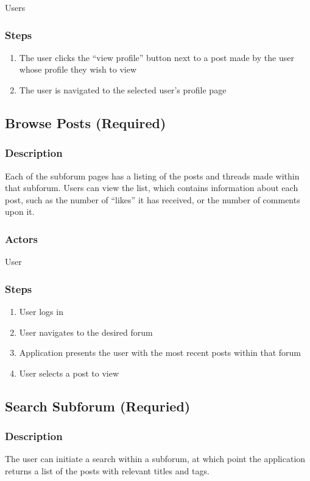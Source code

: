 \documentclass[12pt]{scrartcl}
\begin{document}
Users

\subsubsection{Steps}

\begin{enumerate}
\item The user clicks the “view profile” button next to a post made by the user whose profile they wish to view
\item The user is navigated to the selected user’s profile page
\end{enumerate}

\subsection{Browse Posts (Required)}
\subsubsection{Description}
Each of the subforum pages has a listing of the posts and threads made within that subforum. Users can view the list, which contains
information about each post, such as the number of “likes” it has received, or the number of comments upon it.

\subsubsection {Actors}
User

\subsubsection{Steps}
\begin {enumerate}
\item User logs in
\item User navigates to the desired forum
\item Application presents the user with the most recent posts within that forum
\item User selects a post to view
\end{enumerate}

\subsection{Search Subforum (Requried)}
\subsubsection{Description}
The user can initiate a search within a subforum, at which point the application returns a list of the posts with relevant titles and tags.
\end{document}
